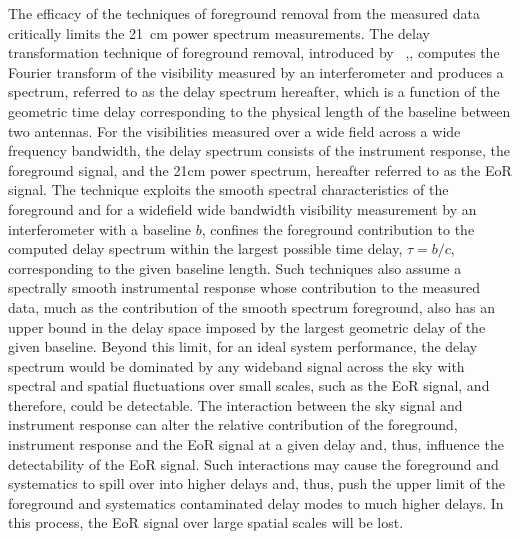 \documentclass[twocolumn]{emulateapj}
\begin{document}
    The efficacy of the techniques of foreground removal from the measured data
    critically limits the 21~cm power spectrum measurements. The delay
    transformation technique of foreground removal, introduced by
    ~\citep{Parsons_Backer_2009},\citep{Parsons_et_al_2012}, computes the Fourier
    transform of the visibility measured by an interferometer and produces a
    spectrum, referred to as the delay spectrum hereafter, which is a function of
    the geometric time delay corresponding to the physical length of the baseline
    between two antennas. For the visibilities measured over a wide field across a
    wide frequency bandwidth, the delay spectrum consists of the instrument
    response, the foreground signal, and the 21cm power spectrum, hereafter
    referred to as the EoR signal.
    The technique exploits the smooth spectral characteristics of the foreground
    and for a widefield wide bandwidth visibility measurement by an interferometer
    with a baseline $b$, confines the foreground contribution to the computed delay
    spectrum within the largest possible time delay, $\tau = b/c$, corresponding to
    the given baseline length. Such techniques also assume a spectrally smooth
    instrumental response whose contribution to the measured data, much as the
    contribution of the smooth spectrum foreground, also has an upper bound in the
    delay space imposed by the largest geometric delay of the given baseline.
    Beyond this limit, for an ideal system performance, the delay spectrum would be
    dominated by any wideband signal across the sky with spectral and spatial
    fluctuations over small scales, such as the EoR signal, and therefore, could be
    detectable. The interaction between the sky signal and instrument response can
    alter the relative contribution of the foreground, instrument response and the
    EoR signal at a given delay and, thus, influence the detectability of the EoR
    signal. Such interactions may cause the foreground and systematics to spill
    over into higher delays and, thus, push the upper limit of the foreground and
    systematics contaminated delay modes to much higher delays. In this process,
    the EoR signal over large spatial scales will be lost. \\
    
\end{document}
